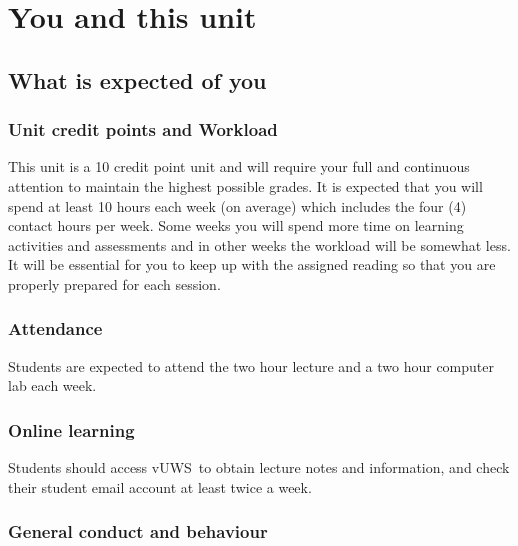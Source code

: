 \documentclass[a4paper,oneside]{book}
\newcommand{\vuws}{vUWS}
\begin{document}
\chapter{You and this unit}

\section{What is expected of you}


\subsection*{Unit credit points and Workload}
This unit is a 10 credit point unit and will require your full and
continuous attention to maintain the highest possible grades.  It is
expected that you will spend at least 10 hours each week (on average)
which includes the four (4) contact hours per week.  Some weeks you
will spend more time on learning activities and assessments and in
other weeks the workload will be somewhat less.  It will be essential
for you to keep up with the assigned reading so that you are properly
prepared for each session.

\subsection*{Attendance}
Students are expected to attend the two hour lecture and a two
hour computer lab each week.

\subsection*{Online learning}
Students should access \vuws~to obtain lecture notes and information,
and check their student email account at least twice a week.

\subsection*{General conduct and behaviour}
\end{document}
